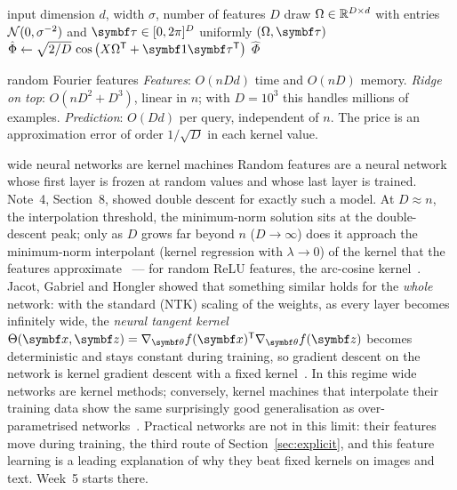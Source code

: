 \documentclass[11pt]{article}
\newcommand{\z}{\vect{z}}
\begin{document}
\begin{algorithm}[htbp]
\caption{Random Fourier features for the Gaussian kernel}\label{alg:rff}
\begin{algorithmic}[1]
\Require input dimension $d$, width $\sigma$, number of features $D$
 
  \State draw $\Omega \in \mathbb{R}^{D \times d}$ with entries $\mathcal{N}(0, \sigma^{-2})$ and $\vect{\tau} \in [0, 2\pi]^D$ uniformly
  \State \Return $(\Omega, \vect{\tau})$
\EndFunction
{} 
  \State $\hat\Phi \gets \sqrt{2/D}\, \cos\big(X\Omega\T + \vect{1}\vect{\tau}\T\big)$ 
  \State \Return $\hat\Phi$ 
\EndFunction
\end{algorithmic}
\end{algorithm}

\begin{runtime}{random Fourier features}
\emph{Features}: $O(nDd)$ time and $O(nD)$ memory. \emph{Ridge on top}: $O(nD^2 + D^3)$, linear in $n$; with $D = 10^3$
this handles millions of examples. \emph{Prediction}: $O(Dd)$ per query, independent of $n$. The price is an approximation
error of order $1/\sqrt D$ in each kernel value.
\end{runtime}

\begin{modern}{wide neural networks are kernel machines}
Random features are a neural network whose first layer is frozen at random values and whose last layer is trained.
Note~4, Section~8, showed double descent for exactly such a model. At $D \approx n$, the interpolation threshold, the
minimum-norm solution sits at the double-descent peak; only as $D$ grows far beyond $n$ ($D \to \infty$) does it approach the minimum-norm interpolant
(kernel regression with $\lambda \to 0$) of the kernel that the features approximate~\cite{belkin2019} --- for random ReLU
features, the arc-cosine kernel~\cite{cho2009}. Jacot, Gabriel and Hongler showed that something similar holds for the
\emph{whole} network: with the standard (NTK) scaling of the weights, as every layer becomes infinitely wide, the
\emph{neural tangent kernel} $\Theta(\x, \z) = \nabla_{\vect{\theta}} f(\x)\T\nabla_{\vect{\theta}} f(\z)$ becomes
deterministic and stays constant during training, so gradient descent on the network is kernel gradient descent with a
fixed kernel~\cite{jacot2018}. In this regime wide networks are kernel methods; conversely, kernel machines that
interpolate their training data show the same surprisingly good generalisation as over-parametrised
networks~\cite{belkin2018}. Practical networks are not in this limit: their features move during training, the third
route of Section~\ref{sec:explicit}, and this feature learning is a leading explanation of why they beat fixed kernels on
images and text. Week~5 starts there.
\end{modern}
\end{document}
